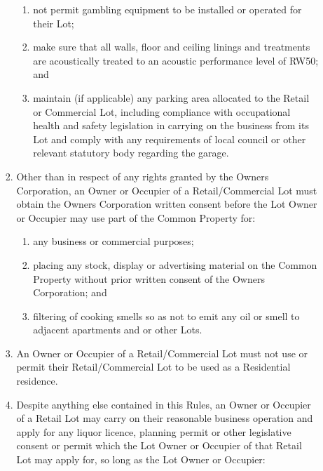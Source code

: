 \documentclass{article}
\begin{document}
\begin{enumerate}[label=\arabic*.]
\begin{enumerate}[label=\arabic{enumi}.\arabic*.]
\begin{enumerate}[label=(\arabic*)]
\begin{enumerate}[label=(\alph*)]
\item  not permit gambling equipment to be installed or operated for their Lot;

\item  make sure that all walls, floor and ceiling linings and treatments are acoustically treated to an acoustic performance level of RW50; and

\item  maintain (if applicable) any parking area allocated to the Retail or Commercial Lot, including compliance with occupational health and safety legislation in carrying on the business from its Lot and comply with any requirements of local council or other relevant statutory body regarding the garage.

\end{enumerate}

\item  Other than in respect of any rights granted by the Owners Corporation, an Owner or Occupier of a Retail/Commercial Lot must obtain the Owners Corporation written consent before the Lot Owner or Occupier may use part of the Common Property for:
\newpage



\begin{enumerate}[label=(\alph*)]

\item  any business or commercial purposes;

\item  placing any stock, display or advertising material on the Common Property without prior written consent of the Owners Corporation; and

\item  filtering of cooking smells so as not to emit any oil or smell to adjacent apartments and or other Lots.

\end{enumerate}

\item  An Owner or Occupier of a Retail/Commercial Lot must not use or permit their Retail/Commercial Lot to be used as a Residential residence.

\item  Despite anything else contained in this Rules, an Owner or Occupier of a Retail Lot may carry on their reasonable business operation and apply for any liquor licence, planning permit or other legislative consent or permit which the Lot Owner or Occupier of that Retail Lot may apply for, so long as the Lot Owner or Occupier:


\end{enumerate}
\end{enumerate}
\end{enumerate}
\end{document}
